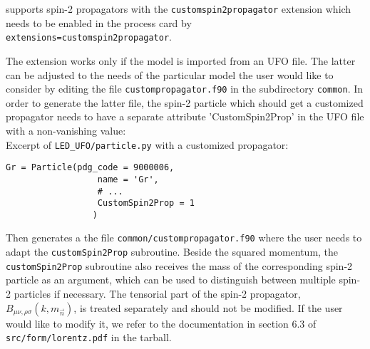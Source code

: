 \gosam{} supports spin-2 propagators with the \texttt{customspin2propagator} extension which
needs to be enabled in the process card by \\
\texttt{extensions=customspin2propagator}.

The extension works only if the model is imported from an UFO file. 
The latter can  be adjusted to the needs of the particular model the 
user would like to consider by editing the file \texttt{custompropagator.f90}
in the subdirectory \texttt{common}. 
In order to generate the latter file,
the spin-2 particle which should get a customized propagator needs to have a
separate attribute 'CustomSpin2Prop' in the UFO file with a non-vanishing
value:\\
Excerpt of \texttt{LED\_UFO/particle.py} with a customized propagator:
\begin{lstlisting}[style=py]
    Gr = Particle(pdg_code = 9000006,
                  name = 'Gr',
                  # ...
                  CustomSpin2Prop = 1
                 )
\end{lstlisting}
Then \gosam{} generates a the file \texttt{common/custompropagator.f90} where the user needs
to adapt the \texttt{customSpin2Prop} subroutine.
Beside the squared momentum, the \texttt{customSpin2Prop} subroutine also receives the
mass of the corresponding spin-2 particle as an argument, which
can be used to distinguish between multiple spin-2 particles if necessary.
The tensorial part of the spin-2 propagator, $B_{\mu\nu,\rho\sigma}(k,m_{\vec n})$, is treated separately 
and should not be modified.  If the user would like to modify it, we refer to the  documentation in 
section 6.3 of \texttt{src/form/lorentz.pdf} in the \gosam{} tarball.

